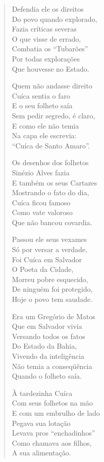 \begin{verse}
Defendia ele os direitos \\
Do povo quando explorado, \\
Fazia críticas severas \\
O que visse de errado, \\
Combatia os ``Tubarões'' \\
Por todas explorações \\
Que houvesse no Estado. 
\pagebreak

Quem não andasse direito \\
Cuíca sentia o faro \\
E o seu folheto saía \\
Sem pedir segredo, é claro, \\
E como ele não temia \\
Na capa ele escrevia: \\
``Cuíca de Santo Amaro''. 

Os desenhos dos folhetos \\
Sinézio Alves fazia \\
E também os seus Cartazes \\
Mostrando o fato do dia, \\
Cuíca ficou famoso \\
Como vate valoroso \\
Que não bancou covardia. 

Passou ele seus vexames \\
Só por versar a verdade, \\
Foi Cuíca em Salvador \\
O Poeta da Cidade, \\
Morreu pobre esquecido, \\
De ninguém foi protegido, \\
Hoje o povo tem saudade. 

Era um Gregório de Matos \\
Que em Salvador vivia \\
Versando todos os fatos \\
Do Estado da Bahia, \\
Vivendo da inteligência \\
Não temia a conseqüência \\
Quando o folheto saía. 
\pagebreak

À tardezinha Cuíca \\
Com seus folhetos na mão \\
E com um embrulho de lado \\
Pegava sua lotação \\
Levava pros ``enchadinhos'' \\
Como chamava aos filhos, \\
A sua alimentação. 


\end{verse}
